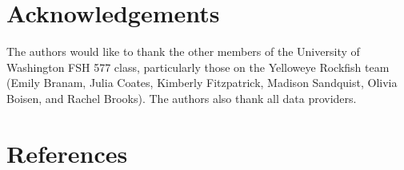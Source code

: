 \documentclass[
  english,
]{article}
\begin{document}
\newpage{}

\section{Acknowledgements}\label{sec-acknowledgements}

The authors would like to thank the other members of the University of
Washington FSH 577 class, particularly those on the Yelloweye Rockfish
team (Emily Branam, Julia Coates, Kimberly Fitzpatrick, Madison
Sandquist, Olivia Boisen, and Rachel Brooks). The authors also thank all
data providers.

\newpage{}

\section{References}\label{references}
\end{document}
